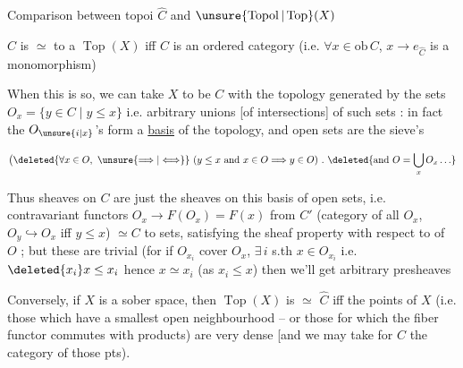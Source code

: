 Comparison between topoi $\widehat C$ and $\unsure{\operatorname{Topol}|\operatorname{Top}}(X)$

$\widehat C$ is $\simeq$ to a $\operatorname{Top}(X)$ iff $C$ is an ordered category (i.e. $\forall x\in\mathrm{ob}\,C$, $x\to e_{\widehat C}$ is a monomorphism)

When this is so, we can take $X$ to be $C$ with the topology generated by the sets $O_x=\{y\in C\mid y\leq x\}$ i.e. arbitrary unions [of intersections] of such sets : in fact \deleted{[NB $x\in\overline{\{y\}}$ iff $y\leq x$] i.e. $y\in O_x$] \unsure{of} Open} the $O_{\unsure{i|x}}$'s form a \uline{basis} of the topology, and open  sets  are  the  sieve's

\[\bigl(\deleted{\forall x\in O,\ \unsure{\Longrightarrow|\Longleftrightarrow}}\ (y\leq x\text{ and }x\in O\Longrightarrow y\in O)\ .\ \deleted{\text{and }O=\bigcup_xO_x\ldots}\]


Thus sheaves on $C$ are just the sheaves on this basis of open sets, i.e. contravariant functors $O_x\to F(O_x)=F(x)$ from $C'$  (category of all $O_x$, $O_y\hookrightarrow O_x$ iff $y\leq x$) $\simeq C$ to sets, satisfying the sheaf property  with respect to   of $O$ ; but these are trivial (for if $O_{x_i}$ cover $O_x$, $\exists\,i$ s.th $x\in O_{x_i}$ i.e. $\deleted{x_i}x\leq x_i$ hence $x\simeq x_i$ (as $x_i\leq x$) then we'll get arbitrary presheaves

Conversely, if $X$ is a sober space, then $\operatorname{Top}(X)$ is $\simeq$  $\widehat C$ iff the   points of $X$ (i.e. those which have a smallest open neighbourhood -- or those for which the fiber functor commutes with products) are very dense [and we may take for $C$ the category of those pts).
